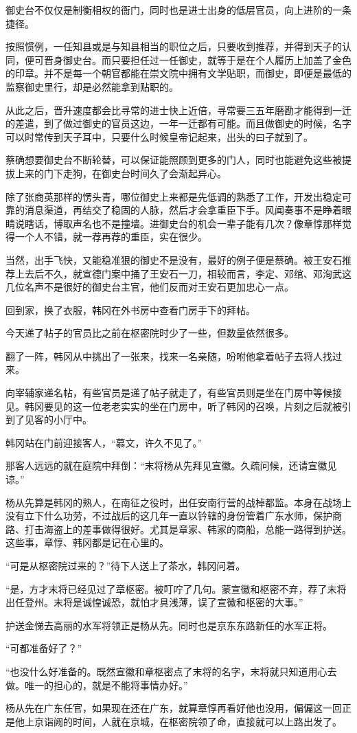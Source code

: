 御史台不仅仅是制衡相权的衙门，同时也是进士出身的低层官员，向上进阶的一条捷径。

按照惯例，一任知县或是与知县相当的职位之后，只要收到推荐，并得到天子的认同，便可晋身御史台。而只要担任过一任御史，就等于是在个人履历上加盖了金色的印章。并不是每一个朝官都能在崇文院中拥有文学贴职，而御史，即便是最低的监察御史里行，却是必然能拿到贴职的。

从此之后，晋升速度都会比寻常的进士快上近倍，寻常要三五年磨勘才能得到一迁的差遣，到了做过御史的官员这边，一年一迁都有可能。而且做御史的时候，名字可以时常传到天子耳中，只要什么时候皇帝记起来，出头的曰子就到了。

蔡确想要御史台不断轮替，可以保证能照顾到更多的门人，同时也能避免这些被提拔上来的门下走狗，在御史台时间久了会渐起异心。

除了张商英那样的愣头青，哪位御史上来都是先低调的熟悉了工作，开发出稳定可靠的消息渠道，再结交了稳固的人脉，然后才会拿重臣下手。风闻奏事不是睁着眼睛说瞎话，博取声名也不是撞墙。进御史台的机会一辈子能有几次？像章惇那样觉得一个人不错，就一荐再荐的重臣，实在很少。

当然，出手飞快，又能稳准狠的御史不是没有，最好的例子便是蔡确。被王安石推荐上去后不久，就宣德门案中捅了王安石一刀，相较而言，李定、邓绾、邓洵武这几位名声不是很好的御史台主官，他们反而对王安石更加忠心一点。

回到家，换了衣服，韩冈在外书房中查看门房手下的拜帖。

今天递了帖子的官员比之前在枢密院时少了一些，但数量依然很多。

翻了一阵，韩冈从中挑出了一张来，找来一名亲随，吩咐他拿着帖子去将人找过来。

向宰辅家递名帖，有些官员是递了帖子就走了，有些官员则是坐在门房中等候接见。韩冈要见的这一位老老实实的坐在门房中，听了韩冈的召唤，片刻之后就被引到了见客的小厅中。

韩冈站在门前迎接客人，“慕文，许久不见了。”

那客人远远的就在庭院中拜倒：“末将杨从先拜见宣徽。久疏问候，还请宣徽见谅。”

杨从先算是韩冈的熟人，在南征之役时，出任安南行营的战棹都监。本身在战场上没有立下什么功劳，不过战后的这几年一直以钤辖的身份管着广东水师，保护商路、打击海盗上的差事做得很好。尤其是章家、韩家的商船，总能一路得到护送。这些事，章惇、韩冈都是记在心里的。

“可是从枢密院过来的？”待下人送上了茶水，韩冈问着。

“是，方才末将已经见过了章枢密。被叮咛了几句。蒙宣徽和枢密不弃，荐了末将出任登州。末将是诚惶诚恐，就怕才具浅薄，误了宣徽和枢密的大事。”

护送金悌去高丽的水军将领正是杨从先。同时也是京东东路新任的水军正将。

“可都准备好了？”

“也没什么好准备的。既然宣徽和章枢密点了末将的名字，末将就只知道用心去做。唯一的担心的，就是不能将事情办好。”

杨从先在广东任官，如果现在还在广东，就算章惇再看好他也没用，偏偏这一回正是他上京诣阙的时间，人就在京城，在枢密院领了命，直接就可以上路出发了。

